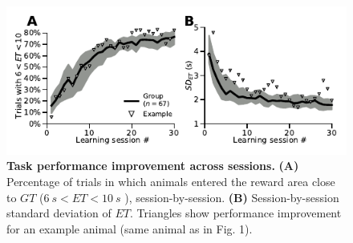 \begin{figure}[h!]
	\begin{center}
	   \includegraphics[scale=1]{ch-appendicies/figures/CorrectTrialCurve.pdf}
	   \caption
	   {\textbf{Task performance improvement across sessions.}
	   \textbf{(A)} Percentage of trials in which animals entered the reward area close to $GT$ ($6~s<ET<10~s$ ), session-by-session.
	   \textbf{(B)} Session-by-session standard deviation of $ET$. Triangles show performance improvement for an example animal (same animal as in Fig. 1).
	   }
	   \label{fig:appendix:CorrectTrialCurve}
	\end{center}
   \end{figure}